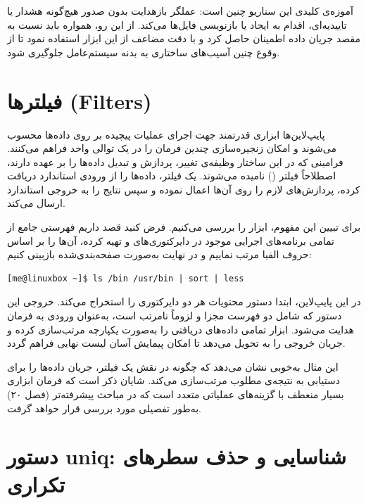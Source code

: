 آموزه‌ی کلیدی این سناریو چنین است: عملگر بازهدایت \cmd{>} بدون صدور هیچ‌گونه هشدار یا تاییدیه‌ای، اقدام به ایجاد یا بازنویسی فایل‌ها می‌کند. از این رو، همواره باید نسبت به مقصد جریان داده اطمینان حاصل کرد و با دقت مضاعف از این ابزار استفاده نمود تا از وقوع چنین آسیب‌های ساختاری به بدنه سیستم‌عامل جلوگیری شود.

\section{فیلتر‌ها (Filters)}

پایپ‌لاین‌ها ابزاری قدرتمند جهت اجرای عملیات پیچیده بر روی داده‌ها محسوب می‌شوند و امکان زنجیره‌سازی چندین فرمان را در یک توالی واحد فراهم می‌کنند. فرامینی که در این ساختار وظیفه‌ی تغییر، پردازش و تبدیل داده‌ها را بر عهده دارند، اصطلاحاً فیلتر () نامیده می‌شوند. یک فیلتر، داده‌ها را از ورودی استاندارد دریافت کرده، پردازش‌های لازم را روی آن‌ها اعمال نموده و سپس نتایج را به خروجی استاندارد ارسال می‌کند.

برای تبیین این مفهوم، ابزار  را بررسی می‌کنیم. فرض کنید قصد داریم فهرستی جامع از تمامی برنامه‌های اجرایی موجود در دایرکتوری‌های  و  تهیه کرده، آن‌ها را بر اساس حروف الفبا مرتب نماییم و در نهایت به‌صورت صفحه‌بندی‌شده بازبینی کنیم:

\begin{latin}
\begin{lstlisting}
[me@linuxbox ~]$ ls /bin /usr/bin | sort | less
\end{lstlisting}
\end{latin}

در این پایپ‌لاین، ابتدا دستور  محتویات هر دو دایرکتوری را استخراج می‌کند. خروجی این دستور که شامل دو فهرست مجزا و لزوماً نامرتب است، به‌عنوان ورودی به فرمان  هدایت می‌شود. ابزار  تمامی داده‌های دریافتی را به‌صورت یکپارچه مرتب‌سازی کرده و جریان خروجی را به  تحویل می‌دهد تا امکان پیمایش آسان لیست نهایی فراهم گردد.

این مثال به‌خوبی نشان می‌دهد که چگونه  در نقش یک فیلتر، جریان داده‌ها را برای دستیابی به نتیجه‌ی مطلوب مرتب‌سازی می‌کند. شایان ذکر است که فرمان  ابزاری بسیار منعطف با گزینه‌های عملیاتی متعدد است که در مباحث پیشرفته‌تر (فصل ۲۰) به‌طور تفصیلی مورد بررسی قرار خواهد گرفت.

\section{دستور uniq: شناسایی و حذف سطرهای تکراری}

